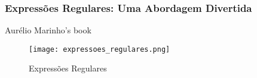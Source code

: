\begin{frame}[fragile]
  \frametitle{Expressões Regulares: Uma Abordagem Divertida}
  Aurélio Marinho's book \cite{jargas2016expressoes}
  \begin{figure}
    \centering
    \texttt{[image: expressoes\_regulares.png]}
    \caption{Expressões Regulares}
    \label{fig:expressoes-regulares}
  \end{figure}
\end{frame}
